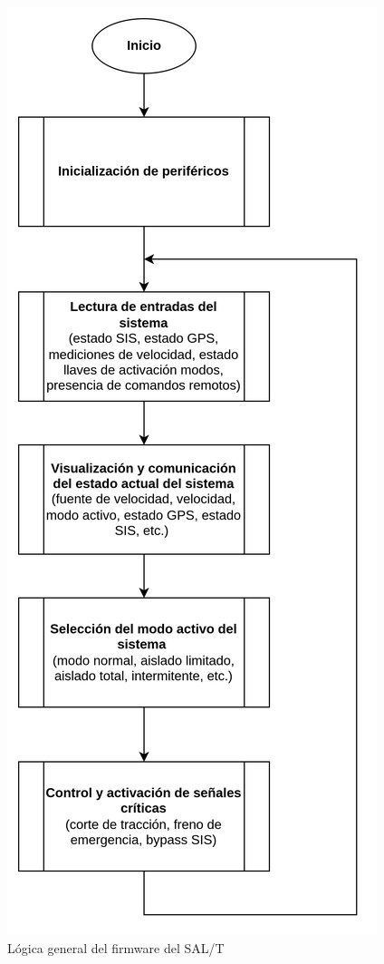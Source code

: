 \begin{figure}[H]
    \centering
    \includegraphics[scale = 0.6]{img/logica_firmware.png}    
    \caption{Lógica general del firmware del SAL/T}
    \label{fig:logica_firmware}
\end{figure}    




